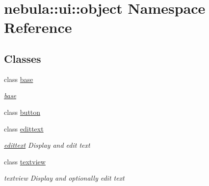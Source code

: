 \hypertarget{namespacenebula_1_1ui_1_1object}{
\section{nebula::ui::object Namespace Reference}
\label{namespacenebula_1_1ui_1_1object}
}
\subsection*{Classes}
\begin{DoxyCompactItemize}
\item 
class \hyperlink{classnebula_1_1ui_1_1object_1_1base}{base}
\begin{DoxyCompactList}\small\item\em \hyperlink{classnebula_1_1ui_1_1object_1_1base}{base} \item\end{DoxyCompactList}\item 
class \hyperlink{classnebula_1_1ui_1_1object_1_1button}{button}
\item 
class \hyperlink{classnebula_1_1ui_1_1object_1_1edittext}{edittext}
\begin{DoxyCompactList}\small\item\em \hyperlink{classnebula_1_1ui_1_1object_1_1edittext}{edittext} Display and edit text \item\end{DoxyCompactList}\item 
class \hyperlink{classnebula_1_1ui_1_1object_1_1textview}{textview}
\begin{DoxyCompactList}\small\item\em textview Display and optionally edit text \item\end{DoxyCompactList}\end{DoxyCompactItemize}
